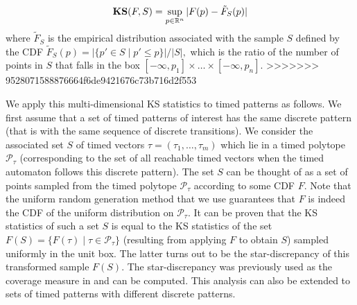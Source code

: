 %
$$\mathbf{KS}(F,S)=\sup_{p\in\mathbb{R}^n}|F(p)-\tilde F_S(p)|$$
where $\tilde F_S$ is the empirical distribution associated with the sample $S$ defined by the CDF 
$\tilde F_S(p)=|\{p'\in S\mid  p'\leq p\}|/|S|,$ which is the ratio of the number of points in $S$ that falls in the box $[-\infty, p_1]\times \ldots\times [-\infty, p_n].$ 
>>>>>>> 9528071588876664f6de9421676c73b716d2f553

We apply this multi-dimensional KS statistics to timed patterns as follows. We first assume that a set of timed patterns of interest has the same discrete pattern (that is with the same sequence of discrete transitions). We consider the associated set $S$ of timed vectors $\tau = (\tau_1, \ldots, \tau_m)$ which lie in a timed polytope $\mathcal{P}_{\tau}$ (corresponding to the set of all reachable timed vectors when the timed automaton follows this discrete pattern). The set $S$ can be thought of as a set of points sampled from the timed polytope $\mathcal{P}_{\tau}$ according to some CDF $F$. Note that the uniform random generation method  \cite{BBBK16}  that we use guarantees that $F$ is indeed the CDF of the uniform distribution on $\mathcal{P}_{\tau}$. It can be proven that the KS statistics of such a set $S$ is equal to the KS statistics of the set $F(S)=\{F(\tau)\mid  \tau \in \mathcal{P}_{\tau}\}$ (resulting from applying $F$ to obtain $S$) sampled uniformly in the unit box. The latter turns out to be the star-discrepancy of this transformed sample $F(S)$. The star-discrepancy was previously used as the coverage measure in \cite{Dang10} and can be computed. This analysis can also be extended to sets of timed patterns with different discrete patterns.

